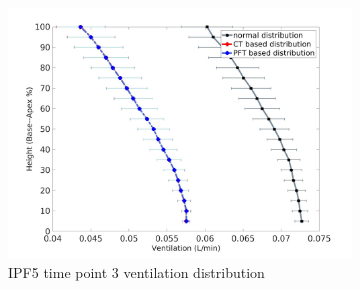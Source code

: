 \begin{figure}[htbp]  
\centering
\begin{subfigure}{.6\linewidth}%
  \includegraphics[width=\linewidth,trim={{.0\wd0} {.0\wd0} {.0\wd0} {.0\wd0}},clip]{Appendix/Image_AppexB/IPF513/IPF513_VentilationAgainstLungHeight.jpg} %
  \caption{IPF5 time point 3 ventilation distribution}
  \label{fig:IPF513VQDistribution-a} 
\end{subfigure} 
\begin{subfigure}{.6\linewidth}%

\end{subfigure}
\end{figure}
